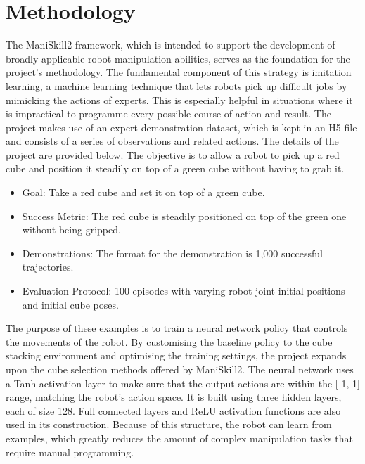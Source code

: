 \documentclass[../report.tex]{subfiles}
\begin{document}
    \section{Methodology}
    \label{sec:methodology}

    The ManiSkill2 framework, which is intended to support the development of broadly applicable robot manipulation abilities, serves as the foundation for the project's methodology. The fundamental component of this strategy is imitation learning, a machine learning technique that lets robots pick up difficult jobs by mimicking the actions of experts. This is especially helpful in situations where it is impractical to programme every possible course of action and result. The project makes use of an expert demonstration dataset, which is kept in an H5 file and consists of a series of observations and related actions. The details of the project are provided below. The objective is to allow a robot to pick up a red cube and position it steadily on top of a green cube without having to grab it.

    \begin{itemize}
        \item Goal: Take a red cube and set it on top of a green cube. 
        \item Success Metric: The red cube is steadily positioned on top of the green one without being gripped. 
        \item Demonstrations: The format for the demonstration is 1,000 successful trajectories. 
        \item Evaluation Protocol: 100 episodes with varying robot joint initial positions and initial cube poses. 
    \end{itemize}
    
    The purpose of these examples is to train a neural network policy that controls the movements of the robot. By customising the baseline policy to the cube stacking environment and optimising the training settings, the project expands upon the cube selection methods offered by ManiSkill2. The neural network uses a Tanh activation layer to make sure that the output actions are within the [-1, 1] range, matching the robot's action space. It is built using three hidden layers, each of size 128. Full connected layers and ReLU activation functions are also used in its construction. Because of this structure, the robot can learn from examples, which greatly reduces the amount of complex manipulation tasks that require manual programming.
    
\end{document}
